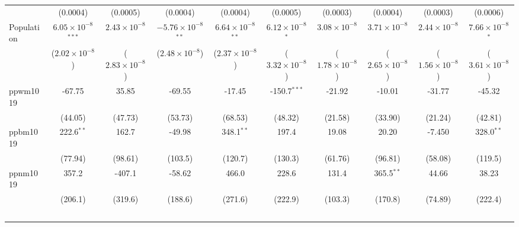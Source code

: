 \documentclass{article}
\begin{document}
\begin{landscape}
\begin{longtable}{@{\extracolsep{5pt}}lccccccccc}
                        & (0.0004)                      & (0.0005)                & (0.0004)                      & (0.0004)                     & (0.0005)                    & (0.0003)                     & (0.0004)                & (0.0003)                      & (0.0006)\\     
   Population             & $6.05\times 10^{-8}$$^{***}$  & $2.43\times 10^{-8}$    & $-5.76\times 10^{-8}$$^{**}$  & $6.64\times 10^{-8}$$^{**}$  & $6.12\times 10^{-8}$$^{*}$  & $3.08\times 10^{-8}$         & $3.71\times 10^{-8}$    & $2.44\times 10^{-8}$          & $7.66\times 10^{-8}$$^{*}$\\    
                        & ($2.02\times 10^{-8}$)        & ($2.83\times 10^{-8}$)  & ($2.48\times 10^{-8}$)        & ($2.37\times 10^{-8}$)       & ($3.32\times 10^{-8}$)      & ($1.78\times 10^{-8}$)       & ($2.65\times 10^{-8}$)  & ($1.56\times 10^{-8}$)        & ($3.61\times 10^{-8}$)\\    
   ppwm1019             & -67.75                        & 35.85                   & -69.55                        & -17.45                       & -150.7$^{***}$              & -21.92                       & -10.01                  & -31.77                        & -45.32\\   
                        & (44.05)                       & (47.73)                 & (53.73)                       & (68.53)                      & (48.32)                     & (21.58)                      & (33.90)                 & (21.24)                       & (42.81)\\   
   ppbm1019             & 222.6$^{**}$                  & 162.7                   & -49.98                        & 348.1$^{**}$                 & 197.4                       & 19.08                        & 20.20                   & -7.450                        & 328.0$^{**}$\\   
                        & (77.94)                       & (98.61)                 & (103.5)                       & (120.7)                      & (130.3)                     & (61.76)                      & (96.81)                 & (58.08)                       & (119.5)\\   
   ppnm1019             & 357.2                         & -407.1                  & -58.62                        & 466.0                        & 228.6                       & 131.4                        & 365.5$^{**}$            & 44.66                         & 38.23\\   
                        & (206.1)                       & (319.6)                 & (188.6)                       & (271.6)                      & (222.9)                     & (103.3)                      & (170.8)                 & (74.89)                       & (222.4)\\   
$$
\end{longtable}
\end{landscape}
\end{document}

